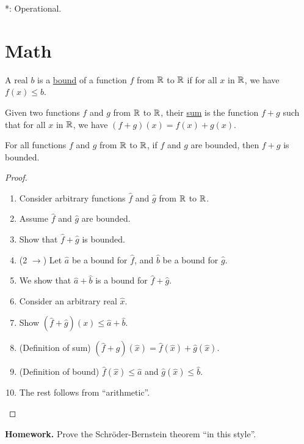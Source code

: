*: Operational.

\section{Math}
\begin{definition}
  A real $b$ is a \underline{bound} of a 
  function $f$ from $\mathbb{R}$ to $\mathbb{R}$ if for all $x$ in 
  $\mathbb{R}$, we have $f(x) \leq b$. 
\end{definition}

\begin{definition}
  Given two functions $f$ and $g$ from $\mathbb{R}$ to 
  $\mathbb{R}$, their \underline{sum} is the function $f + g$ such 
  that for all $x$ in $\mathbb{R}$, we have $(f+g) (x) = f(x) + g(x)$.
\end{definition} 

\begin{theorem}
  For all functions $f$ and $g$ from $\mathbb{R}$ to $\mathbb{R}$, if $f$ and
  $g$ are bounded, then $f+g$ is bounded. 
\end{theorem}
\begin{proof}
  \begin{enumerate}
    \item Consider arbitrary functions $\hat{f}$ and $\hat{g}$ from 
    $\mathbb{R}$ to $\mathbb{R}$.
    \item Assume $\hat{f}$ and $\hat{g}$ are bounded. 
    \item Show that $\hat{f} + \hat{g}$ is bounded.
    \item (2 $\rightarrow$) Let $\hat{a}$ be a bound for $\hat{f}$, 
    and $\hat{b}$ be a bound for $\hat{g}$.
    \item We show that $\hat{a} + \hat{b}$ is a bound for 
    $\hat{f} + \hat{g}$.
    \item Consider an arbitrary real $\hat{x}$.
    \item Show $(\hat{f}+\hat{g})(x) \leq \hat{a} + \hat{b}$.
    \item (Definition of sum) $(\hat{f}+\hat{g})(\hat{x}) 
    = \hat{f}(\hat{x}) + \hat{g}(\hat{x})$.
    \item (Definition of bound) $\hat{f}(\hat{x}) \leq \hat{a}$ and 
    $\hat{g}(\hat{x}) \leq \hat{b}$.
    \item The rest follows from ``arithmetic''. 
  \end{enumerate}
\end{proof}

\noindent \textbf{Homework.} Prove the Schr\"{o}der-Bernstein theorem 
``in this style''.

